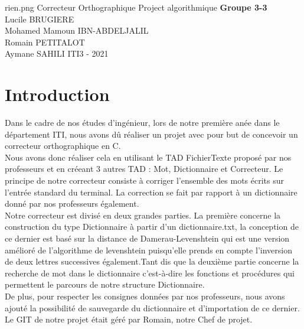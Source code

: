 \documentclass[11pt,a4paper]{article}
\begin{document}
    \PageDeGarde	
    {rien.png} 
    {Correcteur Orthographique} 
    {Project algorithmique} 
    {
    \textbf{Groupe 3-3}\\
    Lucile \textsc{BRUGIERE}\\
    Mohamed Mamoun \textsc{IBN-ABDELJALIL}\\
    Romain \textsc{PETITALOT}\\
    Aymane \textsc{SAHILI}} 
    {ITI3 - 2021}
    
    
    \clearpage 
    
    \tableofcontents
    
    \clearpage
    \section{Introduction}
        Dans le cadre de nos études d'ingénieur, lors de notre première anée dans le département ITI, nous avons dû 
    réaliser un projet avec pour but de concevoir un correcteur orthographique en C.\\
        
        Nous avons donc réaliser cela en utilisant le TAD FichierTexte proposé par nos professeurs et en créeant 3 autres 
    TAD : Mot, Dictionnaire et Correcteur. Le principe de notre correcteur consiste à corriger l'ensemble des mots écrits sur l'entrée standard du terminal. La correction se fait par rapport à un dictionnaire donné par nos professeurs également.\\
        
        Notre correcteur est divisé en deux grandes parties. La première concerne la construction du type Dictionnaire à partir d'un dictionnaire.txt, la conception de ce dernier est basé sur la distance de Damerau-Levenshtein qui est une version amélioré de l'algorithme de levenshtein puisqu'elle prends en compte l'inversion de deux lettres successives également.Tant dis que la deuxième partie concerne la recherche de mot dans le dictionnaire c'est-à-dire les fonctions et procédures qui permettent le parcours de notre structure Dictionnaire.\\
        
        De plus, pour respecter les consignes données par nos professeurs, nous avons ajouté la possibilité de sauvegarde du dictionnaire et d'importation de ce dernier.\\
        
        Le GIT de notre projet était géré par Romain, notre Chef de projet.
        
\end{document}
